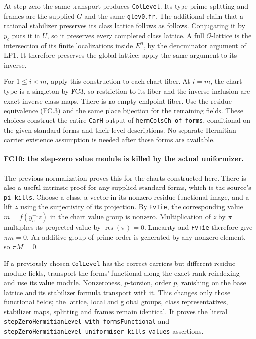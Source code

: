 \documentclass[11pt,a4paper]{article}
\numberwithin{equation}{section}
\theoremstyle{remark}\newtheorem{remark}[theorem]{Remark}
\begin{document}
At step zero the same transport produces \texttt{ColLevel}. Its
type-prime splitting and frames are the supplied $G$ and the same
\texttt{glev0.fr}. The additional claim that a rational stabilizer
preserves its class lattice follows as follows. Conjugating it by $y_c$
puts it in $U$, so it preserves every completed class lattice.
A full $\mathcal O$-lattice is the intersection of its finite localizations
inside $E^n$, by the denominator argument of LP1. It therefore preserves
the global lattice; apply the same argument to its inverse.

For $1\le i<m$, apply this construction to each chart fiber. At
$i=m$, the chart type is a singleton by FC3, so restriction to its
fiber and the inverse inclusion are exact inverse class maps. There
is no empty endpoint fiber. Use the residue equivalence (FC.3) and the
same place bijection for the remaining fields. These choices construct
the entire \texttt{CarH} output of \texttt{hermColsCh\_\allowbreak of\_\allowbreak forms},
conditional on the given standard forms and their level descriptions.
No separate Hermitian carrier existence assumption is needed after
those forms are available.

\paragraph{FC10: the step-zero value module is killed by the actual
uniformizer.}
The previous normalization proves this for the charts constructed here.
There is also a useful intrinsic proof for any supplied standard forms,
which is the source's \texttt{pi\_\allowbreak kills}. Choose a class, a vector in
its nonzero residue-functional image, and a lift $z$ using the
surjectivity of its projection. By \texttt{FvTie}, the corresponding
value $m=f(y_c^{-1}z)$ in the chart value group is nonzero.
Multiplication of $z$ by $\pi$ multiplies its projected value by
$\operatorname{res}(\pi)=0$. Linearity and \texttt{FvTie} therefore
give $\pi m=0$. An additive group of prime order is generated by
any nonzero element, so $\pi M=0$.

If a previously chosen \texttt{ColLevel} has the correct carriers but
different residue-module fields, transport the forms' functional along
the exact rank reindexing and use its value module. Nonzeroness,
$p$-torsion, order $p$, vanishing on the base lattice and its stabilizer
formula transport with it. This changes only those functional fields;
the lattice, local and global groups, class representatives, stabilizer
maps, splitting and frames remain identical. It proves the literal
\texttt{stepZeroHermitianLevel\_\allowbreak with\_\allowbreak formsFunctional} and
\texttt{stepZeroHermitianLevel\_\allowbreak uniformiser\_\allowbreak kills\_\allowbreak values} assertions.
\end{document}
